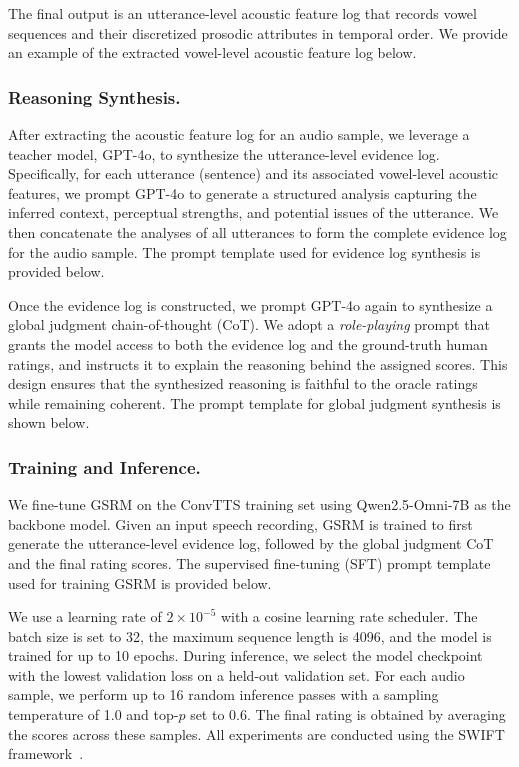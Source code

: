 The final output is an utterance-level acoustic feature log that records vowel sequences and their discretized prosodic attributes in temporal order. We provide an example of the extracted vowel-level acoustic feature log below.



\subsubsection{Reasoning Synthesis.}
After extracting the acoustic feature log for an audio sample, we leverage a teacher model, GPT-4o, to synthesize the utterance-level evidence log. Specifically, for each utterance (sentence) and its associated vowel-level acoustic features, we prompt GPT-4o to generate a structured analysis capturing the inferred context, perceptual strengths, and potential issues of the utterance. We then concatenate the analyses of all utterances to form the complete evidence log for the audio sample. The prompt template used for evidence log synthesis is provided below.


Once the evidence log is constructed, we prompt GPT-4o again to synthesize a global judgment chain-of-thought (CoT). We adopt a \emph{role-playing} prompt that grants the model access to both the evidence log and the ground-truth human ratings, and instructs it to explain the reasoning behind the assigned scores. This design ensures that the synthesized reasoning is faithful to the oracle ratings while remaining coherent. The prompt template for global judgment synthesis is shown below.


\subsubsection{Training and Inference.}
We fine-tune GSRM on the ConvTTS training set using Qwen2.5-Omni-7B as the backbone model. Given an input speech recording, GSRM is trained to first generate the utterance-level evidence log, followed by the global judgment CoT and the final rating scores. The supervised fine-tuning (SFT) prompt template used for training GSRM is provided below.


We use a learning rate of $2\times10^{-5}$ with a cosine learning rate scheduler. The batch size is set to 32, the maximum sequence length is 4096, and the model is trained for up to 10 epochs. During inference, we select the model checkpoint with the lowest validation loss on a held-out validation set. For each audio sample, we perform up to 16 random inference passes with a sampling temperature of 1.0 and top-$p$ set to 0.6. The final rating is obtained by averaging the scores across these samples. All experiments are conducted using the SWIFT framework~\cite{zhao2024swiftascalablelightweightinfrastructure}.
